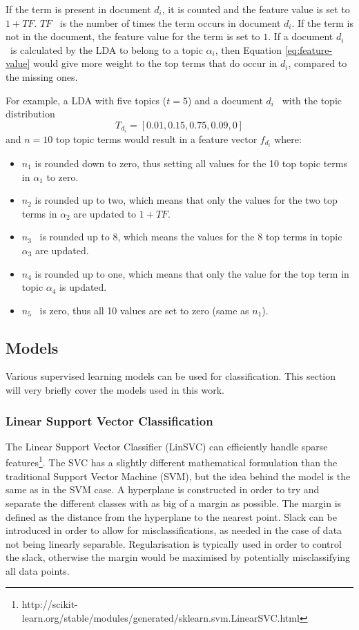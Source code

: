 If the term is present in document $d_i$, it is counted and the feature value is set to $1+TF$.
$TF$  is the number of times the term occurs in document $d_i$.  
If the term is not in the document, the feature value for the term is set to $1$.
If a document $d_i$  is calculated by the LDA to belong to a topic $\alpha_i$, then Equation \ref{eq:feature-value} would give more weight to the top terms that do occur in $d_i$, compared to the missing ones.

For example, a LDA with five topics ($t=5$) and a document $d_i$  with the topic distribution 
\[T_{d_i}=[0.01, 0.15, 0.75, 0.09, 0]\]
and $n=10$ top topic terms would result in a feature vector $f_{d_i}$ where:

\begin{itemize}
    \item $n_1$ is rounded down to zero, thus setting all values for the 10 top topic terms in $\alpha_1$ to zero.
    \item $n_2$ is rounded up to two, which means that only the values for the two top terms in $\alpha_2$ are updated to $1+TF$.
    \item $n_3$  is rounded up to 8, which means the values for the 8 top terms in topic $\alpha_3$ are updated.
    \item $n_4$ is rounded up to one, which means that only the value for the top term in topic $\alpha_4$ is updated.
    \item $n_5$  is zero, thus all 10 values are set to zero (same as $n_1$).
\end{itemize}

\subsection{Models} \label{sec:theory-models}

Various supervised learning models can be used for classification.
This section will very briefly cover the models used in this work.

\subsubsection{Linear Support Vector Classification}
The Linear Support Vector Classifier (LinSVC) can efficiently handle sparse features\footnote{http://scikit-learn.org/stable/modules/generated/sklearn.svm.LinearSVC.html}.
The SVC has a slightly different mathematical formulation than the traditional Support Vector Machine (SVM), but the idea behind the model is the same as in the SVM case.
A hyperplane is constructed in order to try and separate the different classes with as big of a margin as possible.
The margin is defined as the distance from the hyperplane to the nearest point.
Slack can be introduced in order to allow for misclassifications, as needed in the case of data not being linearly separable.
Regularisation is typically used in order to control the slack, otherwise the margin would be maximised by potentially misclassifying all data points.

